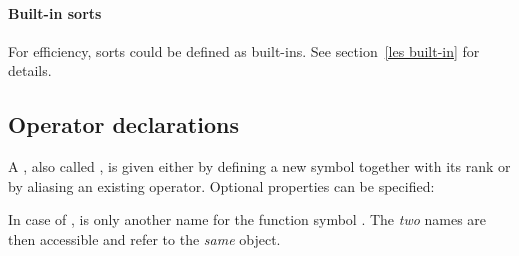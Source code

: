 \paragraph{Built-in sorts}

For efficiency, sorts could be defined as built-ins. See
section~\ref{les built-in} for details.


\subsection{Operator declarations}

A , also called , is given either by
defining a new symbol together 
with its rank or by aliasing an existing operator. Optional properties can
be specified:




In case of ,  is only another
name for the function symbol . The {\it two\/} names are then
accessible and refer to the {\it same\/} object.

